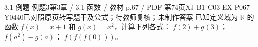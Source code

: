 \par\noindent\begin{minipage}{\linewidth}
\begin{bankitem}{3.1 例题 例题3}{第3章 / 3.1 函数 / 教材 p.67 / PDF 第74页}{XJ-B1-C03-EX-P067-Y0440}{已对照原页转写题干及公式；待教师复核；未制作答案}
已知定义域为 $\mathbb R$ 的函数 $f(x)=x+1$ 和 $g(x)=x^2$，计算下列各式：
$f(2)+g(3)$；
$f(a^2)-g(a)$；
$f(f(f(0)))$。
\end{bankitem}
\end{minipage}\par\medskip
